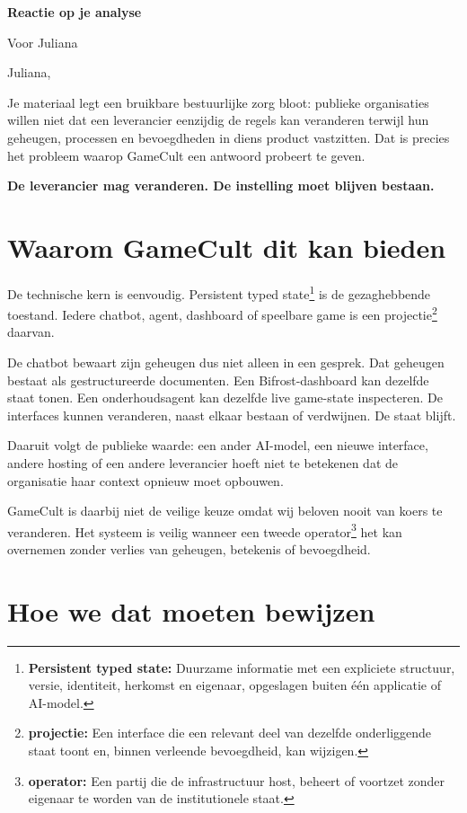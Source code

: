 \documentclass[10pt,a4paper]{article}
\newcommand{\term}[2]{#1\footnote{\textbf{#1:} #2}}
\newcommand{\callout}[1]{%
  \vspace{2pt}\noindent
  \colorbox{wash}{\parbox{\dimexpr\textwidth-2\fboxsep\relax}{\centering\bfseries\Large #1}}
  \vspace{2pt}}
\begin{document}
{\LARGE\bfseries Reactie op je analyse\par}
\vspace{2pt}
{\color{muted} Voor Juliana\par}
\vspace{5pt}

Juliana,

Je materiaal legt een bruikbare bestuurlijke zorg bloot: publieke organisaties willen niet dat een leverancier eenzijdig de regels kan veranderen terwijl hun geheugen, processen en bevoegdheden in diens product vastzitten. Dat is precies het probleem waarop GameCult een antwoord probeert te geven.

\callout{De leverancier mag veranderen. De instelling moet blijven bestaan.}

\section{Waarom GameCult dit kan bieden}

De technische kern is eenvoudig. \term{Persistent typed state}{Duurzame informatie met een expliciete structuur, versie, identiteit, herkomst en eigenaar, opgeslagen buiten één applicatie of AI-model.} is de gezaghebbende toestand. Iedere chatbot, agent, dashboard of speelbare game is een \term{projectie}{Een interface die een relevant deel van dezelfde onderliggende staat toont en, binnen verleende bevoegdheid, kan wijzigen.} daarvan.

De chatbot bewaart zijn geheugen dus niet alleen in een gesprek. Dat geheugen bestaat als gestructureerde documenten. Een Bifrost-dashboard kan dezelfde staat tonen. Een onderhoudsagent kan dezelfde live game-state inspecteren. De interfaces kunnen veranderen, naast elkaar bestaan of verdwijnen. De staat blijft.

Daaruit volgt de publieke waarde: een ander AI-model, een nieuwe interface, andere hosting of een andere leverancier hoeft niet te betekenen dat de organisatie haar context opnieuw moet opbouwen.

GameCult is daarbij niet de veilige keuze omdat wij beloven nooit van koers te veranderen. Het systeem is veilig wanneer een tweede \term{operator}{Een partij die de infrastructuur host, beheert of voortzet zonder eigenaar te worden van de institutionele staat.} het kan overnemen zonder verlies van geheugen, betekenis of bevoegdheid.

\section{Hoe we dat moeten bewijzen}
\end{document}

